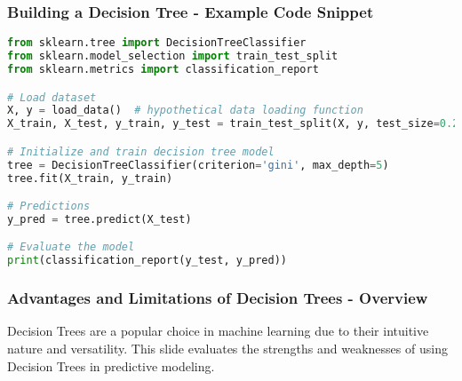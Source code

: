 \documentclass[aspectratio=169]{beamer}
\begin{document}
\begin{frame}[fragile]
    \frametitle{Building a Decision Tree - Example Code Snippet}
    \begin{lstlisting}[language=Python]
from sklearn.tree import DecisionTreeClassifier
from sklearn.model_selection import train_test_split
from sklearn.metrics import classification_report

# Load dataset
X, y = load_data()  # hypothetical data loading function
X_train, X_test, y_train, y_test = train_test_split(X, y, test_size=0.2)

# Initialize and train decision tree model
tree = DecisionTreeClassifier(criterion='gini', max_depth=5)
tree.fit(X_train, y_train)

# Predictions
y_pred = tree.predict(X_test)

# Evaluate the model
print(classification_report(y_test, y_pred))
    \end{lstlisting}
\end{frame}

\begin{frame}[fragile]
    \frametitle{Advantages and Limitations of Decision Trees - Overview}
    Decision Trees are a popular choice in machine learning due to their intuitive nature and versatility. This slide evaluates the strengths and weaknesses of using Decision Trees in predictive modeling.
\end{frame}
\end{document}
